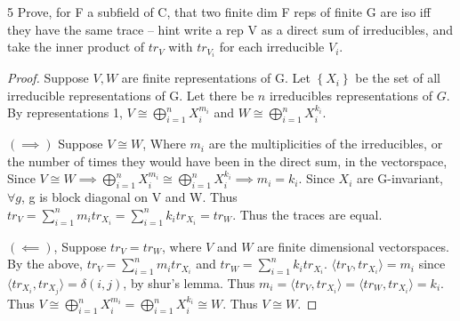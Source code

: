 \documentclass{article}
\newcommand{\angles}[1]{\langle #1 \rangle}
\begin{document}
\bigskip

\begin{PROB}{5}\label{Problem 5.}
    Prove, for F a subfield of C, that two finite dim F  reps of finite G are iso iff they have the same trace -- hint write a rep V as a direct sum of irreducibles, and take the inner product of $tr_V$ with $tr_{V_i}$ for each irreducible $V_i$.
\end{PROB}
\begin{proof}
    Suppose $V, W$ are finite representations of G. Let $\left\{ X_i \right\}$ be the set of all irreducible representations of G. Let there be $n$ irreducibles representations of $G$. By representations 1, $V \cong \bigoplus_{i = 1}^{n} X_i^{m_i}$ and $W \cong \bigoplus_{i = 1}^{n} X_i^{k_i}$.

    $(\implies)$ Suppose $V \cong W$,  Where $m_i$ are the multiplicities of the irreducibles, or the number of times they would have been in the direct sum, in the vectorspace, Since $V \cong W \implies \bigoplus_{i = 1}^{n} X_i^{m_i} \cong \bigoplus_{i = 1}^{n} X_i^{k_i} \implies m_i = k_i$. Since $X_i$ are G-invariant, $\forall g$, g is block diagonal on V and W. Thus $tr_V= \sum_{i = 1}^n m_i tr_{X_i} = \sum_{i = 1}^n k_i tr_{X_i} = tr_W$. Thus the traces are equal. 
    
    $(\impliedby)$, Suppose $tr_V = tr_W$, where $V$ and $W$ are finite dimensional vectorspaces. By the above, $tr_V = \sum_{i = 1}^{n} m_i tr_{X_i}$ and $tr_W = \sum_{i = 1}^n k_i tr_{X_i}$. $\angles{tr_V, tr_{X_i}}= m_i$ since $\angles{tr_{X_i}, tr_{X_j}} = \delta(i, j)$, by shur's lemma. Thus $m_i = \angles{tr_V, tr_{X_i}} = \angles{tr_W, tr_{X_i}} = k_i$. Thus $V \cong \bigoplus_{i = 1}^{n}X_i^{m_i} =  \bigoplus_{i = 1}^{n}X_i^{k_i} \cong W$. Thus $V \cong W$.         
\end{proof}

\bigskip
\end{document}
